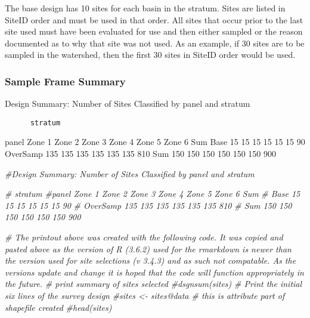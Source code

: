 \documentclass[
]{article}
\newenvironment{Shaded}{\begin{snugshade}}{\end{snugshade}}
\newcommand{\CommentTok}[1]{\textcolor[rgb]{0.56,0.35,0.01}{\textit{#1}}}
\begin{document}
The base design has 10 sites for each basin in the stratum. Sites are
listed in SiteID order and must be used in that order. All sites that
occur prior to the last site used must have been evaluated for use and
then either sampled or the reason documented as to why that site was not
used. As an example, if 30 sites are to be sampled in the watershed,
then the first 30 sites in SiteID order would be used.

\hypertarget{sample-frame-summary}{%
\subsubsection{\texorpdfstring{\textbf{Sample Frame
Summary}}{Sample Frame Summary}}\label{sample-frame-summary}}

Design Summary: Number of Sites Classified by panel and stratum

\begin{verbatim}
      stratum
\end{verbatim}

panel Zone 1 Zone 2 Zone 3 Zone 4 Zone 5 Zone 6 Sum Base 15 15 15 15 15
15 90 OverSamp 135 135 135 135 135 135 810 Sum 150 150 150 150 150 150
900

\begin{Shaded}
\begin{Highlighting}[]
\CommentTok{#Design Summary: Number of Sites Classified by panel and stratum}

\CommentTok{#          stratum}
\CommentTok{#panel      Zone 1 Zone 2 Zone 3 Zone 4 Zone 5 Zone 6 Sum}
\CommentTok{#  Base         15     15     15     15     15     15  90}
\CommentTok{#  OverSamp    135    135    135    135    135    135 810}
\CommentTok{#  Sum         150    150    150    150    150    150 900}


\CommentTok{# The printout above was created with the following code.  It was copied and pasted above as the version of R (3.6.2) used for the rmarkdown is newer than the version used for site selections (v 3.4.3) and as such not compatable.  As the versions update and change it is hoped that the code will function appropriately in the future.}
\CommentTok{# print summary of sites selected}
\CommentTok{#dsgnsum(sites)}
\CommentTok{# Print the initial six lines of the survey design}
\CommentTok{#sites <- sites@data    # this is attribute part of shapefile created}
\CommentTok{#head(sites)}
\end{Highlighting}
\end{Shaded}
\end{document}

